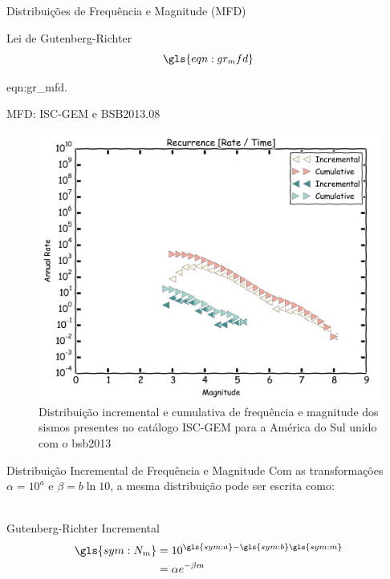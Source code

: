 \documentclass[ucs,8pt]{beamer}
\begin{document}
\begin{frame}{Distribuições de Frequência e Magnitude (MFD)}
	\begin{block}{Lei de Gutenberg-Richter}
		\begin{equation}
			\gls{eqn:gr_mfd}
			\label{eq:gr_mfd}
		\end{equation}
	\end{block}
	\small
	\glsdesc*{eqn:gr_mfd}.
\end{frame}


\begin{frame}{MFD: ISC-GEM e BSB2013.08}
\begin{figure}[H]
   \centering
   \includegraphics[height=0.90\textheight]{occurrence}
   \caption[Distribuição incremental e cumulativa de frequência e magnitude dos sismos presentes no catálogo ISC-GEM
   para a América do Sul unido com o \gls{bsb2013}]
   {Distribuição incremental e cumulativa de frequência e magnitude dos sismos presentes no catálogo ISC-GEM
   para a América do Sul unido com o \gls{bsb2013}} 
   \label{f:occurrence}
\end{figure} 
\end{frame}



\begin{frame}{Distribuição Incremental de Frequência e Magnitude}
Com as transformações $\alpha = 10^a$ e $\beta = b\ln{10}$, a mesma
distribuição pode ser escrita como: \\~\\

	\begin{block}{Gutenberg-Richter Incremental}
		\begin{equation}
			\begin{split}
				\gls{sym:N_m} &= 10^{\gls{sym:a} - \gls{sym:b}\gls{sym:m}} \\
							  &= \alpha e^{-\beta m}
			\end{split}
			\label{eq:gr_exp}
		\end{equation}
	\end{block}

\end{frame}
\end{document}
